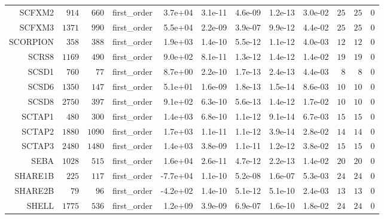 \begin{longtable}{rrrrrrrrrrrr}
  SCFXM2 & \(   914\) & \(   660\) & first\_order &  3.7e+04 &  3.1e-11 &  4.6e-09 &  1.2e-13 &  3.0e-02 & \(    25\) & \(    25\) & \(     0\) \\
  SCFXM3 & \(  1371\) & \(   990\) & first\_order &  5.5e+04 &  2.2e-09 &  3.9e-07 &  9.9e-12 &  4.4e-02 & \(    25\) & \(    25\) & \(     0\) \\
  SCORPION & \(   358\) & \(   388\) & first\_order &  1.9e+03 &  1.4e-10 &  5.5e-12 &  1.1e-12 &  4.0e-03 & \(    12\) & \(    12\) & \(     0\) \\
  SCRS8 & \(  1169\) & \(   490\) & first\_order &  9.0e+02 &  8.1e-11 &  1.3e-12 &  1.4e-12 &  1.4e-02 & \(    19\) & \(    19\) & \(     0\) \\
  SCSD1 & \(   760\) & \(    77\) & first\_order &  8.7e+00 &  2.2e-10 &  1.7e-13 &  2.4e-13 &  4.4e-03 & \(     8\) & \(     8\) & \(     0\) \\
  SCSD6 & \(  1350\) & \(   147\) & first\_order &  5.1e+01 &  1.6e-09 &  1.8e-13 &  1.5e-14 &  8.6e-03 & \(    10\) & \(    10\) & \(     0\) \\
  SCSD8 & \(  2750\) & \(   397\) & first\_order &  9.1e+02 &  6.3e-10 &  5.6e-13 &  1.4e-12 &  1.7e-02 & \(    10\) & \(    10\) & \(     0\) \\
  SCTAP1 & \(   480\) & \(   300\) & first\_order &  1.4e+03 &  6.8e-10 &  1.1e-12 &  9.1e-14 &  6.7e-03 & \(    15\) & \(    15\) & \(     0\) \\
  SCTAP2 & \(  1880\) & \(  1090\) & first\_order &  1.7e+03 &  1.1e-11 &  1.1e-12 &  3.9e-14 &  2.8e-02 & \(    14\) & \(    14\) & \(     0\) \\
  SCTAP3 & \(  2480\) & \(  1480\) & first\_order &  1.4e+03 &  3.8e-09 &  1.1e-11 &  1.2e-12 &  3.8e-02 & \(    15\) & \(    15\) & \(     0\) \\
  SEBA & \(  1028\) & \(   515\) & first\_order &  1.6e+04 &  2.6e-11 &  4.7e-12 &  2.2e-13 &  1.4e-02 & \(    20\) & \(    20\) & \(     0\) \\
  SHARE1B & \(   225\) & \(   117\) & first\_order & -7.7e+04 &  1.1e-10 &  5.2e-08 &  1.6e-07 &  5.3e-03 & \(    24\) & \(    24\) & \(     0\) \\
  SHARE2B & \(    79\) & \(    96\) & first\_order & -4.2e+02 &  1.4e-10 &  5.1e-12 &  5.1e-10 &  2.4e-03 & \(    13\) & \(    13\) & \(     0\) \\
  SHELL & \(  1775\) & \(   536\) & first\_order &  1.2e+09 &  3.9e-09 &  6.9e-07 &  1.6e-10 &  1.8e-02 & \(    24\) & \(    24\) & \(     0\) \\

\end{longtable}
